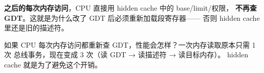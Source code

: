 \textbf{之后的每次内存访问}，CPU 直接用 hidden cache 中的 base/limit/权限，
\textbf{不再查 GDT}。这就是为什么改了 GDT 后必须重新加载段寄存器——
否则 hidden cache 里还是旧的描述符。

\begin{thinkbox}
如果 CPU 每次内存访问都重新查 GDT，性能会怎样？一次内存读取原本只需 1 次
总线事务，现在变成 3 次（读 GDT → 读描述符 → 读目标内存）。
hidden cache 就是为了避免这个开销。
\end{thinkbox}


